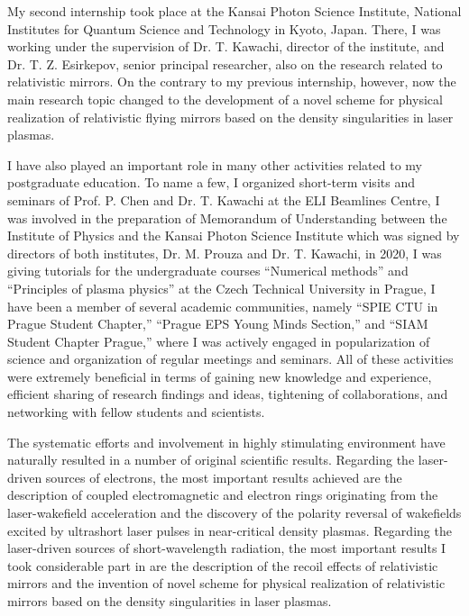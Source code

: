 \documentclass[10pt, a4paper, twoside, openright]{report}
\newcommand{\q}[1]{``#1''} %
\begin{document}

My second internship took place at the Kansai Photon Science Institute, National Institutes for Quantum Science and Technology in Kyoto, Japan. There, I was working under the supervision of Dr. T. Kawachi, director of the institute, and Dr. T. Z. Esirkepov, senior principal researcher, also on the research related to relativistic mirrors. On the contrary to my previous internship, however, now the main research topic changed to the development of a novel scheme for physical realization of relativistic flying mirrors based on the density singularities in laser plasmas. 


I have also played an important role in many other activities related to my postgraduate education. To name a few, I organized short-term visits and seminars of Prof. P. Chen and Dr. T. Kawachi at the ELI Beamlines Centre, I was involved in the preparation of Memorandum of Understanding between the Institute of Physics and the Kansai Photon Science Institute which was signed by directors of both institutes, Dr. M. Prouza and Dr. T. Kawachi, in 2020, I was giving tutorials for the undergraduate courses \q{Numerical methods} and \q{Principles of plasma physics} at the Czech Technical University in Prague, I have been a member of several academic communities, namely \q{SPIE CTU in Prague Student Chapter,} \q{Prague EPS Young Minds Section,} and \q{SIAM Student Chapter Prague,} where I was actively engaged in popularization of science and organization of regular meetings and seminars. All of these activities were extremely beneficial in terms of gaining new knowledge and experience, efficient sharing of research findings and ideas, tightening of collaborations, and networking with fellow students and scientists.

The systematic efforts and involvement in highly stimulating environment have naturally resulted in a number of original scientific results. Regarding the laser-driven sources of electrons, the most important results achieved are the description of coupled electromagnetic and electron rings originating from the laser-wakefield acceleration and the discovery of the polarity reversal of wakefields excited by ultrashort laser pulses in near-critical density plasmas. Regarding the laser-driven sources of short-wavelength radiation, the most important results I took considerable part in are the description of the recoil effects of relativistic mirrors and the invention of novel scheme for physical realization of relativistic mirrors based on the density singularities in laser plasmas. 
\end{document}
